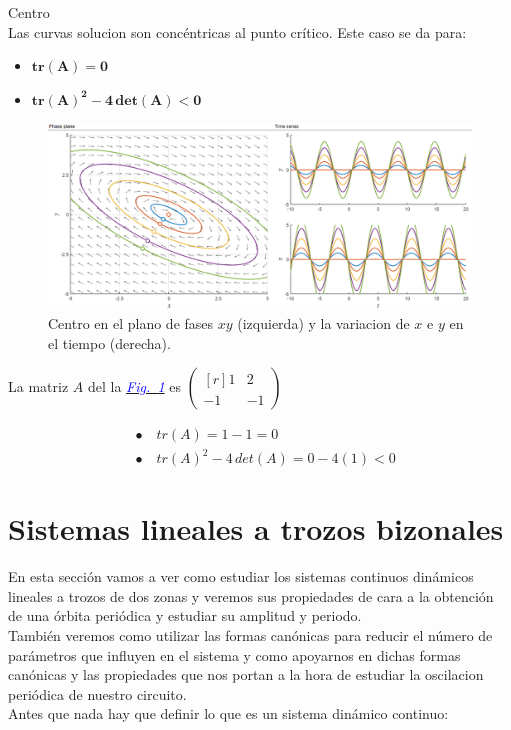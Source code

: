 \documentclass[12pt,a4paper]{report} %
\newcommand{\fref}[1]{\hyperref[#1]{\textcolor{blue}{\textit{Fig.~\ref*{#1}}}}}
\begin{document}
	\newpage
	
    {\Large\textbullet\quad Centro}\\[0.5cm]
    
    Las curvas solucion son concéntricas al punto crítico. Este caso se da para: 
    \begin{itemize}
    	\item $\bm{tr(A)=0}$
    	\item $\bm{tr(A)^2-4\,det(A)<0}$
    \end{itemize}
    
    \begin{figure}[h]
    	\centering
    	\includegraphics[width=1\textwidth]{centro.png}
    	\caption{Centro en el plano de fases $xy$ (izquierda) y la variacion de $x$ e $y$ en el tiempo (derecha).}
    	\label{fig:centro}
    \end{figure}\smallskip
    
    La matriz $A$ del la \fref{fig:centro} es 
    $\begin{pmatrix*}[r]
    	1 & 2 \\
    	-1 & -1
    \end{pmatrix*}$
    
    \begin{align*}
    	&\bullet\quad tr(A)=1-1=0 \\[2mm]
    	&\bullet\quad tr(A)^2-4\,det(A)=0-4(1)<0
    \end{align*}
	
	\newpage
	\section{Sistemas lineales a trozos bizonales}
	En esta sección vamos a ver como estudiar los sistemas continuos dinámicos lineales a trozos de dos zonas y veremos sus propiedades de cara a la obtención de una órbita periódica y estudiar su amplitud y periodo.\\[0.5cm] También veremos como utilizar las formas canónicas para reducir el número de parámetros que influyen en el sistema y como apoyarnos en dichas formas canónicas y las propiedades que nos portan a la hora de estudiar la oscilacion periódica de nuestro circuito.\\[0.5cm]
	Antes que nada hay que definir lo que es un sistema dinámico continuo:
	
\end{document}
